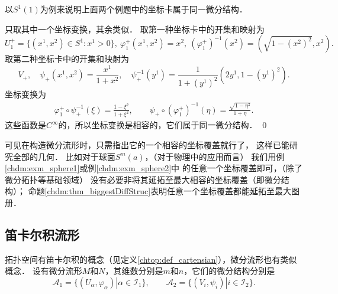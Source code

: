 \begin{example}\label{chdm:exm_sphere12}
    以$S^1(1)$为例来说明上面两个例题中的坐标卡属于同一微分结构．
\end{example}
只取其中一个坐标变换，其余类似．
取第一种坐标卡中的开集和映射为
\begin{equation*}
    U_1 ^{+} = \{(x^1,x^2)\in S^1: x^1 > 0 \}, \ 
    \varphi_1 ^{+}(x^1,x^2) = x^2, \ 
    (\varphi_1 ^{+})^{-1}(x^2)=\left(\sqrt{1-(x^2)^2},x^2\right) .
\end{equation*}
取第二种坐标卡中的开集和映射为
\begin{equation*}
    V_+, \quad \psi_{+}(x^1,x^2) = \frac{x^1}{1+x^{2}}, \quad
    \psi_{+}^{-1}(y^1) = \frac{1}{1+(y^1)^2}\left(2  y^1, 1-(y^1)^2\right) .
\end{equation*}
坐标变换为
\begin{align}
    \varphi_1 ^{+} \circ \psi_{+}^{-1}(\xi) = \frac{1-\xi^2}{1+\xi^2}, \qquad
    \psi_{+}\circ (\varphi_1 ^{+})^{-1}(\eta) =\frac{\sqrt{1-\eta^2}}{1+\eta} .
\end{align}
这些函数是$C^\infty$的，所以坐标变换是相容的，它们属于同一微分结构．
\qed

{ %
    可见在构造微分流形时，只需指出它的一个相容的坐标覆盖就行了，
    这样已能研究全部的几何．  比如对于球面$S^m(a)$，（对于物理中的应用而言）
    我们用例\ref{chdm:exm_sphere1}或例\ref{chdm:exm_sphere2}中
    的任意一个坐标覆盖即可，（除了微分拓扑等基础领域）
    没有必要非将其延拓至最大相容的坐标覆盖（即微分结构）；
    命题\ref{chdm:thm_biggestDiffStruc}表明任意一个坐标覆盖都能延拓至最大图册．}

\subsection{笛卡尔积流形}\label{chdm:sec_cartensian-product}
拓扑空间有笛卡尔积的概念（见定义\ref{chtop:def_cartensian}），微分流形也有类似概念．
设有微分流形$M$和$N$，其维数分别是$m$和$n$，它们的微分结构分别是
\begin{equation}
    \mathscr{A}_1=\{(U_\alpha, \varphi_\alpha)|\alpha\in \mathscr{I}_1 \}, \qquad
    \mathscr{A}_2=\{(V_i, \psi_i)|i\in \mathscr{I}_2 \} .
\end{equation}

